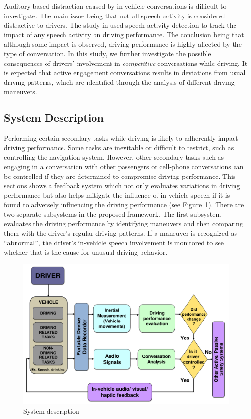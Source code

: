 Auditory based distraction caused by in-vehicle conversations is difficult to investigate. The main issue being that not all speech activity is considered distractive to drivers. 
The study in \cite{ESPA} used speech activity detection to track the impact of any speech activity on driving performance. 
The conclusion being that although some impact is observed, driving performance is highly affected by the type of conversation. 
In this study, we further investigate the possible consequences of drivers' involvement in \emph{competitive} conversations while driving. 
It is expected that active engagement conversations results in deviations from usual driving patterns, which are identified through the analysis of different driving maneuvers. 

\subsection{System Description}
\label{sec:system_description}
\vspace{3mm}
Performing certain secondary tasks while driving is likely to adherently impact driving performance. 
Some tasks are inevitable or difficult to restrict, such as controlling the navigation system. 
However, other secondary tasks such as engaging in a conversation with other passengers or cell-phone conversations can be controlled if they are determined to compromise driving performance. 
This sections shows a feedback system which not only evaluates variations in driving performance but also helps mitigate the influence of in-vehicle speech if it is found to adversely influencing the driving performance (see Figure~\ref{fig:ch6_system_description_fig}). 
There are two separate subsystems in the proposed framework. 
The first subsystem evaluates the driving performance by identifying maneuvers and then comparing them with the driver's regular driving patterns. 
If a maneuver is recognized as ``abnormal'', the driver's in-vehicle speech involvement is monitored to see whether that is the cause for unusual driving behavior. 

\begin{figure}[h]	
	\centering
	\includegraphics[width=\linewidth]{figures/system_description-crop}
	\caption {System description}
	\label{fig:ch6_system_description_fig}
\end{figure}

